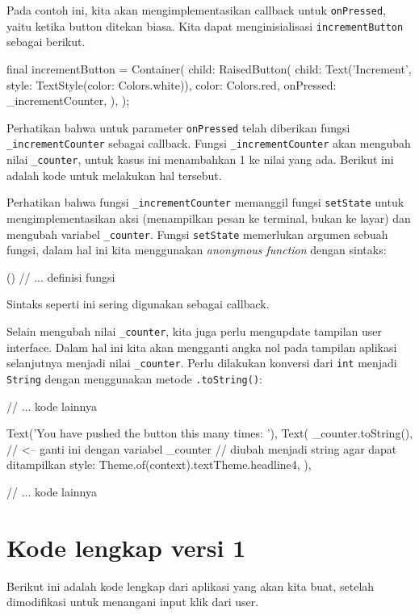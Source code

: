 \documentclass[a4paper,11pt]{article} %
\newcommand{\txtinline}[1]{\texttt{#1}}
\begin{document}
Pada contoh ini, kita akan mengimplementasikan callback untuk
\txtinline{onPressed}, yaitu ketika button ditekan biasa.
Kita dapat menginisialisasi \txtinline{incrementButton} sebagai berikut.
\begin{dartcode}
final incrementButton = Container(
  child: RaisedButton(
    child: Text('Increment', style: TextStyle(color: Colors.white)),
    color: Colors.red,
    onPressed: _incrementCounter,
  ),
);
\end{dartcode}
Perhatikan bahwa untuk parameter \txtinline{onPressed} telah diberikan
fungsi \txtinline{_incrementCounter} sebagai callback.
Fungsi \txtinline{_incrementCounter} akan mengubah nilai \txtinline{_counter},
untuk kasus ini menambahkan 1 ke nilai yang ada.
Berikut ini adalah kode untuk melakukan hal tersebut.
Perhatikan bahwa fungsi \txtinline{_incrementCounter} memanggil
fungsi \txtinline{setState}
untuk mengimplementasikan aksi (menampilkan pesan ke terminal, bukan ke layar)
dan mengubah variabel \txtinline{_counter}.
Fungsi \txtinline{setState} memerlukan argumen sebuah fungsi, dalam hal ini
kita menggunakan \textit{anonymous function} dengan sintaks:
\begin{dartcode}
() {
  // ... definisi fungsi
}
\end{dartcode}
Sintaks seperti ini sering digunakan sebagai callback.

Selain mengubah nilai \txtinline{_counter}, kita juga perlu mengupdate
tampilan user interface. Dalam hal ini kita akan mengganti angka nol pada
tampilan aplikasi selanjutnya menjadi nilai \txtinline{_counter}.
Perlu dilakukan konversi dari \txtinline{int} menjadi \txtinline{String}
dengan menggunakan metode \txtinline{.toString()}:
\begin{dartcode}
// ... kode lainnya

  Text('You have pushed the button this many times: '),
  Text(
    _counter.toString(), // <-- ganti ini dengan variabel _counter
                         // diubah menjadi string agar dapat ditampilkan
    style: Theme.of(context).textTheme.headline4,
  ),

// ... kode lainnya
\end{dartcode}

\section{Kode lengkap versi 1}
Berikut ini adalah kode lengkap dari aplikasi yang akan kita buat, setelah
dimodifikasi untuk menangani input klik dari user.
\end{document}

